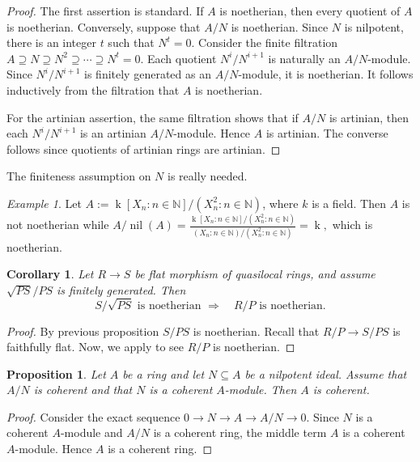 \documentclass[10pt,a4paper]{amsart}
\newtheorem{proposition}[theorem]{Proposition}
\newtheorem{corollary}[theorem]{Corollary}
\theoremstyle{definition}
\theoremstyle{remark}
\newtheorem{example}[theorem]{Example}
\newcommand{\nil}{\operatorname{nil}}
\newcommand{\kk}{\operatorname{k}}
\begin{document}
 \begin{proof}
 	The first assertion is standard. If \(A\) is noetherian, then every
 	quotient of \(A\) is noetherian. Conversely, suppose that \(A/N\) is
noetherian. Since \(N\) is nilpotent, there is an integer \(t\) such
 	that
  $
 	N^t=0.
 	$ Consider the finite filtration
 $
 	A\supseteq N\supseteq N^2\supseteq\cdots\supseteq N^t=0.
 	$  Each quotient \(N^i/N^{i+1}\) is naturally an \(A/N\)-module. Since
 	\(N^i/N^{i+1}\) is finitely generated as an \(A/N\)-module, it is
 	noetherian. It follows inductively from the filtration that \(A\) is
 	noetherian.
 	
 	For the artinian assertion, the same filtration shows that if
 	\(A/N\) is artinian, then each
  $
 	N^i/N^{i+1}
 	$ is an artinian \(A/N\)-module. Hence \(A\) is artinian. The converse
 	follows since quotients of artinian rings are artinian.
 \end{proof}
The finiteness assumption on $N$ is really needed.
\begin{example}
	Let $A:=\kk[X_n:n\in \mathbb{N}]/(X_n^2:n\in \mathbb{N})$, where $k$ is a field. Then $A$ is not noetherian while 
	$A/ \nil(A)=\frac{\kk[X_n:n\in \mathbb{N}]/(X_n^2:n\in \mathbb{N})}{(X_n:n\in \mathbb{N})/(X_n^2:n\in \mathbb{N})}=\kk,$ which is noetherian.
\end{example}


\begin{corollary}
Let $R\to S$ be flat morphism of quasilocal rings, and assume \(\sqrt{PS}/PS\) is finitely generated.
Then  
\[
S/\sqrt{PS}\text{ is noetherian }\Longrightarrow\quad R/P\text{ is noetherian.} 
\]	
\end{corollary}

\begin{proof}
By previous proposition $S/ {PS}$ is noetherian. Recall that $R/P\to S/ {PS}$ is faithfully flat. Now, we apply \cite[Ex. 7.9]{mat} to see $R/P$  is noetherian. 
\end{proof}

\begin{proposition}
	Let \(A\) be a ring and let \(N\subseteq A\) be a nilpotent ideal. Assume
	that \(A/N\) is coherent and that \(N\) is a coherent \(A\)-module. Then
	\(A\) is coherent.
\end{proposition}

\begin{proof}
	Consider the exact sequence
$
	0\to N\to A\to A/N
	\to 0.
	$ 	Since \(N\) is a coherent \(A\)-module and \(A/N\) is a coherent ring,
	the middle term \(A\) is a coherent \(A\)-module. Hence \(A\) is a
	coherent ring.
\end{proof}
\end{document}

